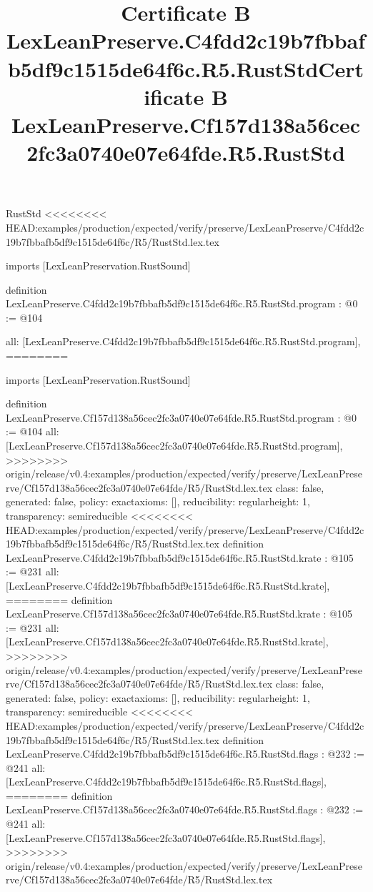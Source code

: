 \begin{lexlean}{RustStd}
<<<<<<<< HEAD:examples/production/expected/verify/preserve/LexLeanPreserve/C4fdd2c19b7fbbafb5df9c1515de64f6c/R5/RustStd.lex.tex
\title{Certificate B LexLeanPreserve.C4fdd2c19b7fbbafb5df9c1515de64f6c.R5.RustStd}
\begin{coremodule}
imports [LexLeanPreservation.RustSound]

definition LexLeanPreserve.C4fdd2c19b7fbbafb5df9c1515de64f6c.R5.RustStd.program : @0 := @104 {
  all: [LexLeanPreserve.C4fdd2c19b7fbbafb5df9c1515de64f6c.R5.RustStd.program],
========
\title{Certificate B LexLeanPreserve.Cf157d138a56cec2fc3a0740e07e64fde.R5.RustStd}
\begin{coremodule}
imports [LexLeanPreservation.RustSound]

definition LexLeanPreserve.Cf157d138a56cec2fc3a0740e07e64fde.R5.RustStd.program : @0 := @104 {
  all: [LexLeanPreserve.Cf157d138a56cec2fc3a0740e07e64fde.R5.RustStd.program],
>>>>>>>> origin/release/v0.4:examples/production/expected/verify/preserve/LexLeanPreserve/Cf157d138a56cec2fc3a0740e07e64fde/R5/RustStd.lex.tex
  class: false,
  generated: false,
  policy: exact{axioms: []},
  reducibility: regular{height: 1},
  transparency: semireducible
}
<<<<<<<< HEAD:examples/production/expected/verify/preserve/LexLeanPreserve/C4fdd2c19b7fbbafb5df9c1515de64f6c/R5/RustStd.lex.tex
definition LexLeanPreserve.C4fdd2c19b7fbbafb5df9c1515de64f6c.R5.RustStd.krate : @105 := @231 {
  all: [LexLeanPreserve.C4fdd2c19b7fbbafb5df9c1515de64f6c.R5.RustStd.krate],
========
definition LexLeanPreserve.Cf157d138a56cec2fc3a0740e07e64fde.R5.RustStd.krate : @105 := @231 {
  all: [LexLeanPreserve.Cf157d138a56cec2fc3a0740e07e64fde.R5.RustStd.krate],
>>>>>>>> origin/release/v0.4:examples/production/expected/verify/preserve/LexLeanPreserve/Cf157d138a56cec2fc3a0740e07e64fde/R5/RustStd.lex.tex
  class: false,
  generated: false,
  policy: exact{axioms: []},
  reducibility: regular{height: 1},
  transparency: semireducible
}
<<<<<<<< HEAD:examples/production/expected/verify/preserve/LexLeanPreserve/C4fdd2c19b7fbbafb5df9c1515de64f6c/R5/RustStd.lex.tex
definition LexLeanPreserve.C4fdd2c19b7fbbafb5df9c1515de64f6c.R5.RustStd.flags : @232 := @241 {
  all: [LexLeanPreserve.C4fdd2c19b7fbbafb5df9c1515de64f6c.R5.RustStd.flags],
========
definition LexLeanPreserve.Cf157d138a56cec2fc3a0740e07e64fde.R5.RustStd.flags : @232 := @241 {
  all: [LexLeanPreserve.Cf157d138a56cec2fc3a0740e07e64fde.R5.RustStd.flags],
>>>>>>>> origin/release/v0.4:examples/production/expected/verify/preserve/LexLeanPreserve/Cf157d138a56cec2fc3a0740e07e64fde/R5/RustStd.lex.tex
}}}
\end{coremodule}}
\end{coremodule}
\end{lexlean}
